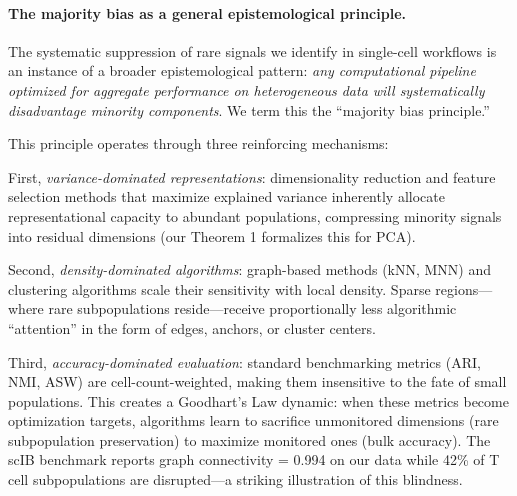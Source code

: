 


\paragraph{The majority bias as a general epistemological principle.}
The systematic suppression of rare signals we identify in single-cell workflows is an instance of a broader epistemological pattern: \textit{any computational pipeline optimized for aggregate performance on heterogeneous data will systematically disadvantage minority components}. We term this the ``majority bias principle.''

This principle operates through three reinforcing mechanisms:

First, \textit{variance-dominated representations}: dimensionality reduction and feature selection methods that maximize explained variance inherently allocate representational capacity to abundant populations, compressing minority signals into residual dimensions (our Theorem 1 formalizes this for PCA).

Second, \textit{density-dominated algorithms}: graph-based methods (kNN, MNN) and clustering algorithms scale their sensitivity with local density. Sparse regions---where rare subpopulations reside---receive proportionally less algorithmic ``attention'' in the form of edges, anchors, or cluster centers.

Third, \textit{accuracy-dominated evaluation}: standard benchmarking metrics (ARI, NMI, ASW) are cell-count-weighted, making them insensitive to the fate of small populations. This creates a Goodhart's Law dynamic\cite{goodhart1984}: when these metrics become optimization targets, algorithms learn to sacrifice unmonitored dimensions (rare subpopulation preservation) to maximize monitored ones (bulk accuracy). The scIB benchmark\cite{luecken2022} reports graph connectivity = 0.994 on our data while 42\% of T cell subpopulations are disrupted---a striking illustration of this blindness.

